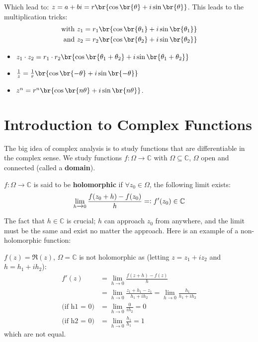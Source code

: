 Which lead to: $z=a+bi=r \br{ \cos \br{\theta} +i \sin \br{\theta } }$. This leads to the multiplication tricks:
\begin{align*}
\text{with } & z_1=r_1 \br{ \cos \br{\theta_1 } +i \sin \br{\theta_1 } }\\
\text{and } & z_2=r_2 \br{ \cos \br{\theta_2 } +i \sin \br{\theta_2 } }
\end{align*}
\begin{itemize}
    \item $z_1\cdot z_2 = r_1 \cdot r_2 \br{ \cos \br{\theta_1+\theta_2}+i \sin\br{\theta_1+\theta_2}}$
    \item $\frac{1}{z} = \frac{1}{r} \br{ \cos \br{ -\theta } +i \sin \br{ -\theta } }$
    \item $z^n = r^n \br{ \cos\br{n\theta}+i \sin\br{n\theta}}$.
\end{itemize}


\section{Introduction to Complex Functions}

The big idea of complex analysis is to study functions that are differentiable in the complex sense. We study functions $f:\Omega \xrightarrow{} \mathbb{C}$ with $\Omega \subseteq \mathbb{C}$, $\Omega$ open and connected (called a \textbf{domain}).


\begin{definition}[Holomorphism]
$f:\Omega \xrightarrow{} \mathbb{C}$ is said to be \textbf{holomorphic} if $\forall z_0 \in \Omega$, the following limit exists:
\begin{align*}
    \lim_{h\xrightarrow{} 0} \frac{f(z_0+h)-f(z_0)}{h} =\vcentcolon f'(z_0) \in \mathbb{C}\\
\end{align*}

\end{definition}

The fact that $h\in \mathbb{C}$ is crucial; $h$ can approach $z_0$ from anywhere, and the limit must be the same and exist no matter the approach. Here is an example of a non-holomorphic function:

\begin{counterexample}\label{cex:non-hlc}
$f(z)=\Re(z)$, $\Omega = \mathbb{C}$ is not holomorphic as (letting $z = z_1 + i z_2$ and $h = h_1 + i h_2$):
\begin{align*}
    f'(z) &= \lim_{h\xrightarrow{} 0}\frac{f(z+h)-f(z)}{h}\\
    &= \lim_{h\xrightarrow{} 0}\frac{z_1+h_1-z_1}{h_1+ih_2} = \lim_{h\xrightarrow{} 0}\frac{h_1}{h_1+ih_2}\\
    \text{(if h1 = 0)} &= \lim_{h\xrightarrow{} 0}\frac{0}{ih_2}=0\\
    \text{(if h2 = 0)} &= \lim_{h\xrightarrow{} 0}\frac{h_1}{h_1}=1
\end{align*} which are not equal.
\end{counterexample}


